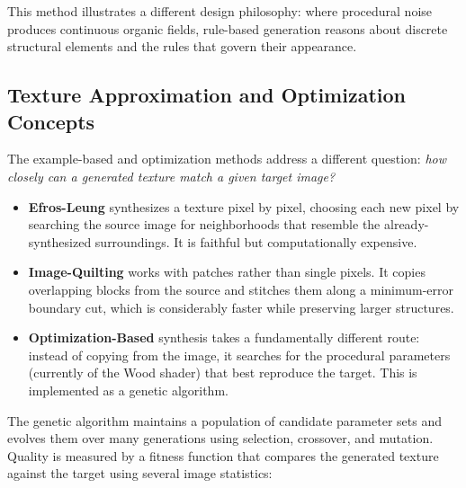 This method illustrates a different design philosophy: where procedural noise produces continuous organic fields, rule-based generation reasons about discrete structural elements and the rules that govern their appearance.

\clearpage
\subsection{Texture Approximation and Optimization Concepts}

The example-based and optimization methods address a different question: \textit{how closely can a generated texture match a given target image?}

\begin{itemize}[noitemsep, topsep=0pt]
    \item \textbf{Efros-Leung} synthesizes a texture pixel by pixel, choosing each new pixel by searching the source image for neighborhoods that resemble the already-synthesized surroundings. It is faithful but computationally expensive.
    \item \textbf{Image-Quilting} works with patches rather than single pixels. It copies overlapping blocks from the source and stitches them along a minimum-error boundary cut, which is considerably faster while preserving larger structures.
    \item \textbf{Optimization-Based} synthesis takes a fundamentally different route: instead of copying from the image, it searches for the procedural parameters (currently of the Wood shader) that best reproduce the target. This is implemented as a genetic algorithm.
\end{itemize}

The genetic algorithm maintains a population of candidate parameter sets and evolves them over many generations using selection, crossover, and mutation. Quality is measured by a fitness function that compares the generated texture against the target using several image statistics:

